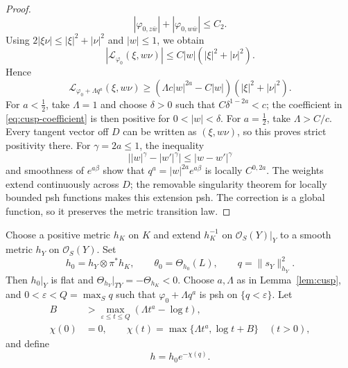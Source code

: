 \documentclass[11pt]{amsart}
\theoremstyle{definition}
\theoremstyle{remark}
\numberwithin{equation}{section}
\newcommand{\OO}{\mathcal O}
\newcommand{\Levi}{\mathcal L}
\begin{document}
\begin{proof}
\[ |\varphi_{0,z\bar w}|+|\varphi_{0,w\bar w}|\le C_2.
\]
Using $2|\xi\nu|\le |\xi|^2+|\nu|^2$ and $|w|\le1$, we obtain
\[
 |\Levi_{\varphi_0}(\xi,w\nu)|
 \le C|w|(|\xi|^2+|\nu|^2).
\]
Hence
\begin{equation}\label{eq:cusp-coefficient}
 \Levi_{\varphi_0+\Lambda q^a}(\xi,w\nu)
 \ge (\Lambda c|w|^{2a}-C|w|)(|\xi|^2+|\nu|^2).
\end{equation}
For $a<\tfrac12$, take $\Lambda=1$ and choose $\delta>0$ such
that $C\delta^{1-2a}<c$; the coefficient in
\eqref{eq:cusp-coefficient} is then positive for $0<|w|<\delta$.
For $a=\tfrac12$, take $\Lambda>C/c$.
Every tangent vector off $D$ can be written as $(\xi,w\nu)$,
so this proves strict positivity there.
For $\gamma=2a\le1$, the inequality
\[
 \bigl||w|^\gamma-|w'|^\gamma\bigr|\le |w-w'|^\gamma
\]
and smoothness of $e^{a\beta}$ show that
$q^a=|w|^{2a}e^{a\beta}$ is locally $C^{0,2a}$.
The weights extend continuously across $D$; the removable singularity
theorem for locally bounded psh functions makes this extension psh.
The correction is a global function, so it preserves the metric
transition law.
\end{proof}

\label{sec:global}
Choose a positive metric $h_K$ on $K$ and extend $h_K^{-1}$ on
$\OO_S(Y)|_Y$ to a smooth metric $h_Y$ on $\OO_S(Y)$. Set
\begin{equation}\label{eq:baseline-metric}
 h_0=h_Y\otimes\pi^*h_K,\qquad
 \theta_0=\Theta_{h_0}(L),\qquad q=\|s_Y\|_{h_Y}^2.
\end{equation}
Then $h_0|_Y$ is flat and $\Theta_{h_Y}|_{TY}=-\Theta_{h_K}<0$.
Choose $a,\Lambda$ as in Lemma~\ref{lem:cusp}, and
$0<\varepsilon<Q=\max_Sq$ such that
$\varphi_0+\Lambda q^a$ is psh on $\{q<\varepsilon\}$. Let
\begin{equation}\label{eq:chi}
 \begin{split}
 B&>\max_{\varepsilon\le t\le Q}(\Lambda t^a-\log t),\\
 \chi(0)&=0,\qquad
 \chi(t)=\max\{\Lambda t^a,\log t+B\}\quad(t>0),
 \end{split}
\end{equation}
and define
\begin{equation}\label{eq:global-metric}
 h=h_0e^{-\chi(q)}.
\end{equation}
\end{document}
